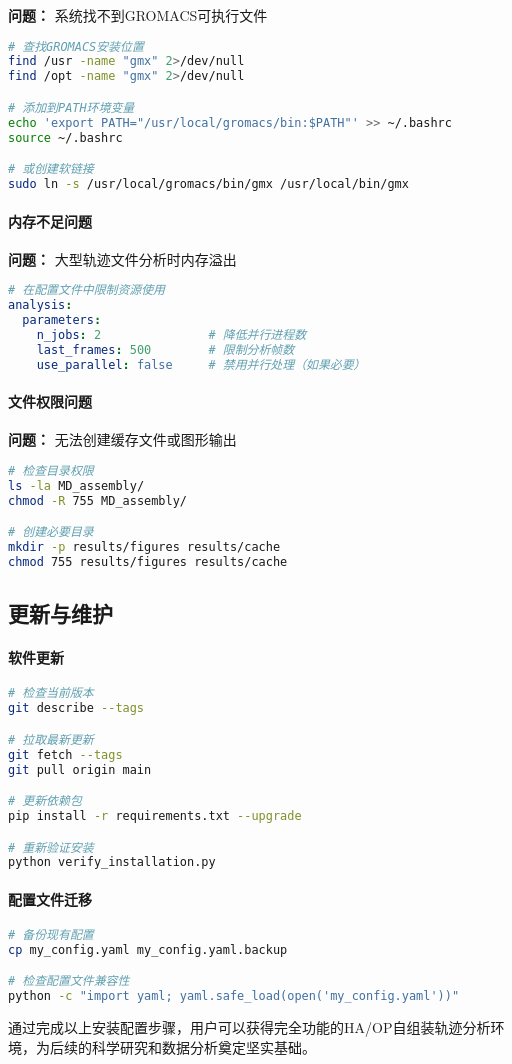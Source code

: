 \textbf{问题：} 系统找不到GROMACS可执行文件
\begin{lstlisting}[language=bash,style=blockstyle]
# 查找GROMACS安装位置
find /usr -name "gmx" 2>/dev/null
find /opt -name "gmx" 2>/dev/null

# 添加到PATH环境变量
echo 'export PATH="/usr/local/gromacs/bin:$PATH"' >> ~/.bashrc
source ~/.bashrc

# 或创建软链接
sudo ln -s /usr/local/gromacs/bin/gmx /usr/local/bin/gmx
\end{lstlisting}

\paragraph{内存不足问题}

\textbf{问题：} 大型轨迹文件分析时内存溢出
\begin{lstlisting}[language=yaml,style=blockstyle]
# 在配置文件中限制资源使用
analysis:
  parameters:
    n_jobs: 2               # 降低并行进程数
    last_frames: 500        # 限制分析帧数
    use_parallel: false     # 禁用并行处理（如果必要）
\end{lstlisting}

\paragraph{文件权限问题}

\textbf{问题：} 无法创建缓存文件或图形输出
\begin{lstlisting}[language=bash,style=blockstyle]
# 检查目录权限
ls -la MD_assembly/
chmod -R 755 MD_assembly/

# 创建必要目录
mkdir -p results/figures results/cache
chmod 755 results/figures results/cache
\end{lstlisting}

\subsection{更新与维护}
\label{subsec:maintenance}

\paragraph{软件更新}

\begin{lstlisting}[language=bash,style=blockstyle]
# 检查当前版本
git describe --tags

# 拉取最新更新
git fetch --tags
git pull origin main

# 更新依赖包
pip install -r requirements.txt --upgrade

# 重新验证安装
python verify_installation.py
\end{lstlisting}

\paragraph{配置文件迁移}

\begin{lstlisting}[language=bash,style=blockstyle]
# 备份现有配置
cp my_config.yaml my_config.yaml.backup

# 检查配置文件兼容性
python -c "import yaml; yaml.safe_load(open('my_config.yaml'))"
\end{lstlisting}

通过完成以上安装配置步骤，用户可以获得完全功能的HA/OP自组装轨迹分析环境，为后续的科学研究和数据分析奠定坚实基础。